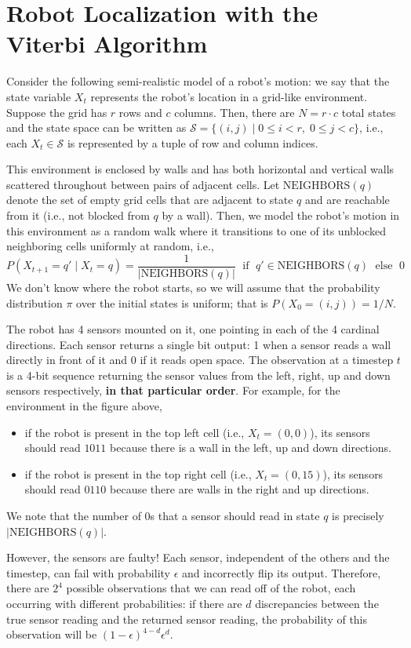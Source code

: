 \documentclass{article}
\newcommand{\Question}[1]{\Large \section{ #1 } \normalsize}
\begin{document}
\fontsize{12}{15}\selectfont

\Question{Robot Localization with the Viterbi Algorithm}
Consider the following semi-realistic model of a robot's motion: we say that the state variable $X_t$ represents the robot's location in a grid-like environment. 
Suppose the grid has $r$ rows and $c$ columns. 
Then, there are $N = r \cdot c$ total states and the state space can be written as $\mathcal{S} = \{(i, j) \mid 0 \leq i < r,\; 0 \leq j < c\}$, i.e., each $X_t \in \mathcal{S}$ is represented by a tuple of row and column indices. 

This environment is enclosed by walls and has both horizontal and vertical walls scattered throughout between pairs of adjacent cells. 
Let $\mathrm{NEIGHBORS}(q)$ denote the set of empty grid cells that are adjacent to state $q$ and are reachable from it (i.e., not blocked from $q$ by a wall).
Then, we model the robot's motion in this environment as a random walk where it transitions to one of its unblocked neighboring cells uniformly at random, i.e.,
\[
    P(X_{t+1} = q' \mid X_t = q) = \frac{1}{|\mathrm{NEIGHBORS}(q)|} \;\text{ if }\; q' \in \mathrm{NEIGHBORS}(q) \;\text{ else }\; 0
\]
We don't know where the robot starts, so we will assume that the probability distribution $\pi$ over the initial states is uniform; that is $P(X_0 = (i, j)) = 1/N$.

The robot has 4 sensors mounted on it, one pointing in each of the 4 cardinal directions. 
Each sensor returns a single bit output: 1 when a sensor reads a wall directly in front of it and 0 if it reads open space. 
The observation at a timestep $t$ is a 4-bit sequence returning the sensor values from the left, right, up and down sensors respectively, \textbf{in that particular order}. 
For example, for the environment in the figure above, 
\begin{itemize}
    \item if the robot is present in the top left cell (i.e., $X_t = (0, 0)$), its sensors should read $1011$ because there is a wall in the left, up and down directions.
    \item if the robot is present in the top right cell (i.e., $X_t = (0, 15)$), its sensors should read $0110$ because there are walls in the right and up directions.
\end{itemize} 
We note that the number of 0s that a sensor should read in state $q$ is precisely $|\mathrm{NEIGHBORS}(q)|$.

However, the sensors are faulty! 
Each sensor, independent of the others and the timestep, can fail with probability $\epsilon$ and incorrectly flip its output. 
Therefore, there are $2^4$ possible observations that we can read off of the robot, each occurring with different probabilities: if there are $d$ discrepancies between the true sensor reading and the returned sensor reading, the probability of this observation will be $(1 - \epsilon)^{4 - d}\epsilon^d$.
\end{document}

